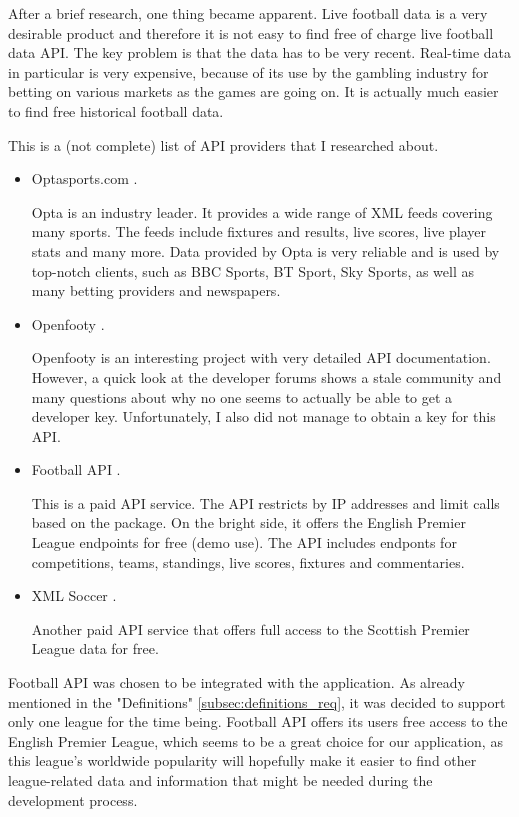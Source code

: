 After a brief research, one thing became apparent. Live football data is a very desirable product and therefore it is not easy to find free of charge live football data API. The key problem is that the data has to be very recent. Real-time data in particular is very expensive, because of its use by the gambling industry for betting on various markets as the games are going on. It is actually much easier to find free historical football data.  
	
This is a (not complete) list of API providers that I researched about.
	
\begin{itemize}
	\item Optasports.com \citep{source:opta}.\par
Opta is an industry leader. It provides a wide range of XML feeds covering many sports. The feeds include fixtures and results, live scores, live player stats and many more. Data provided by Opta is very reliable and is used by top-notch clients, such as BBC Sports, BT Sport, Sky Sports, as well as many betting providers and newspapers.		
	\item Openfooty \citep{source:openfooty}.\par 
	Openfooty is an interesting project with very detailed API documentation. However, a quick look at the developer forums shows a stale community and many questions about why no one seems to actually be able to get a developer key. Unfortunately, I also did not manage to obtain a key for this API.			
	\item Football API \citep{source:footballapi} .\par
This is a paid API service. The API restricts by IP addresses and limit calls based on the package. On the bright side, it offers the English Premier League endpoints for free (demo use). The API includes endponts for competitions, teams, standings, live scores, fixtures and commentaries.	
	\item XML Soccer \citep{source:xmlsoccer}. \par
	Another paid API service that offers full access to the Scottish Premier League data for free.
		
\end{itemize}
	
Football API was chosen to be integrated with the application. As already mentioned in the "Definitions" \ref{subsec:definitions_req}, it was decided to support only one league for the time being. Football API offers its users free access to the English Premier League, which seems to be a great choice for our application, as this league's worldwide popularity will hopefully make it easier to find other league-related data and information that might be needed during the development process.

